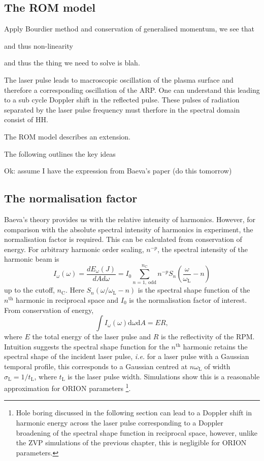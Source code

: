 \subsection{The ROM model}

Apply Bourdier method and conservation of generalised momentum, we see that 

and thus non-linearity

and thus the thing we need to solve is blah.


The laser pulse leads to macroscopic oscillation of the plasma surface and therefore a corresponding oscillation of the ARP. One can understand this leading to a sub cycle Doppler shift in the reflected pulse. These pulses of radiation separated by the laser pulse frequency must therfore in the spectral domain consist of HH.

The \ac{ROM} model describes an extension. 

The following outlines the key ideas 

Ok: assume I have the expression from Baeva's paper (do this tomorrow)

\subsection{The normalisation factor}
Baeva's theory provides us with the relative intensity of harmonics. However, for comparison with the absolute spectral intensity of harmonics in experiment, the normalisation factor is required. This can be calculated from conservation of energy. For arbitrary harmonic order scaling, $n^{-p}$, the spectral intensity of the harmonic beam is
\begin{equation}
	I_\omega(\omega) = \frac{dE_\omega(J)}{dAd\omega} = I_0 \sum^{n_\mathrm{C}}_{n = 1,\ \mathrm{odd}} n^{-p} S_n\left( \frac{\omega}{\omega_\mathrm{L}}-n\right)
\end{equation}
up to the cutoff, $n_\mathrm{C}$. Here $S_n(\omega/\omega_\mathrm{L}-n)$ is the spectral shape function of the $n^\mathrm{th}$ harmonic in reciprocal space and $I_0$ is the normalisation factor of interest. From conservation of energy,
\begin{equation}
	\int I_\omega(\omega) \mathrm{d}\omega \mathrm{d} A = ER,
\end{equation}
where $E$ the total energy of the laser pulse and $R$ is the reflectivity of the \ac{RPM}. Intuition suggests the spectral shape function for the $n^\mathrm{th}$ harmonic retains the spectral shape of the incident laser pulse, \textit{i.e.} for a laser pulse with a Gaussian temporal profile, this corresponds to a Gaussian centred at $n\omega_\mathrm{L}$ of width $\sigma_\mathrm{L} = 1/t_\mathrm{L}$, where $t_\mathrm{L}$ is the laser pulse width. Simulations show this is a reasonable approximation for ORION parameters \footnote{Hole boring discussed in the following section can lead to a Doppler shift in harmonic energy across the laser pulse corresponding to a Doppler broadening of the spectral shape function in reciprocal space, however, unlike the ZVP simulations of the previous chapter, this is negligible for ORION parameters.}.

